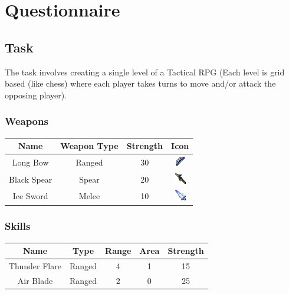 \section{Questionnaire}
\subsection{Task}

The task involves creating a single level of a Tactical RPG (Each level is grid based (like chess) where each player takes turns to move and/or attack the opposing player).   

\subsubsection*{Weapons}
\begin{center}
\begin{tabular}{c|c|c|c|}
	Name        & Weapon Type & Strength & Icon \\\hline
	Long Bow    & Ranged      & 30       & \includegraphics[height=0.5cm]{figures/bow.png}   \\ 
	Black Spear & Spear       & 20       & \includegraphics[height=0.5cm]{figures/spear.png} \\ 
	Ice Sword   & Melee       & 10       & \includegraphics[height=0.5cm]{figures/sword.png} \\ 
\end{tabular}
\end{center}

\subsubsection*{Skills}
\begin{center}
	\begin{tabular}{c|c|c|c|c}
		
		Name          & Type   & Range & Area & Strength \\\hline
		Thunder Flare & Ranged & 4     & 1    & 15       \\ 
	 	Air Blade     & Ranged & 2     & 0    & 25       \\ 
	\end{tabular}
\end{center}


